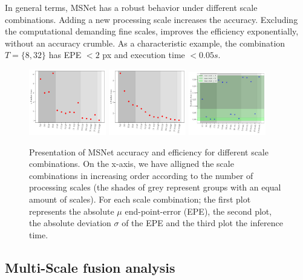 \documentclass[runningheads]{llncs}
\begin{document}
In general terms, MSNet has a robust behavior under different scale combinations. Adding a new processing scale increases the accuracy. Excluding the computational demanding fine scales, improves the efficiency exponentially, without an accuracy crumble. As a characteristic example, the combination $T = \{8, 32\}$ has EPE $<2$ px and execution time $<0.05s$. 

\begin{figure}[htb!]
    \centering
    \includegraphics[width=0.3\textwidth]{figures/msnet_scales_evaluation1.pdf}
    \includegraphics[width=0.3\textwidth]{figures/msnet_scales_evaluation2.pdf}
    \includegraphics[width=0.3\textwidth]{paper/latex/figures/msnet_inference_times.pdf}
    \caption{Presentation of MSNet accuracy and efficiency for different scale combinations. On the x-axis, we have alligned the scale combinations in increasing order according to the number of processing scales (the shades of grey represent groups with an equal amount of scales). For each scale combination; the first plot represents the absolute $\mu$ end-point-error (EPE), the second plot, the absolute deviation $\sigma$ of the EPE and the third plot the inference time.}
    \label{fig:msnet_scales_evaluation}

\end{figure}

\subsection{Multi-Scale fusion analysis} \label{sec:4_1}
\end{document}
